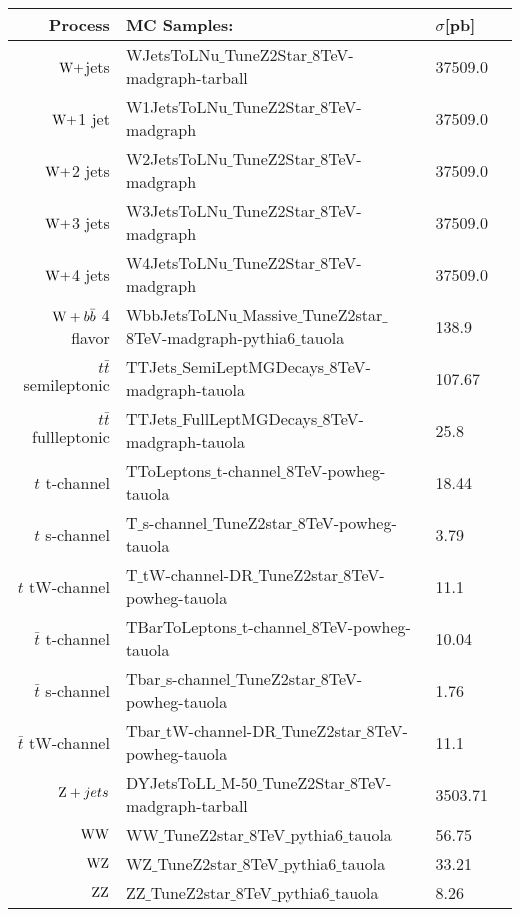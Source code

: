 {\begin{table}[htb]
\begin{center}
\begin{tabular}{|r|l|l|l|}
\bf Process&\bf MC Samples:& \bf{$\sigma$[pb]}\\ 
\hline
$\mathrm{W} + $jets   & WJetsToLNu$\_$TuneZ2Star$\_$8TeV-madgraph-tarball               &37509.0 \\ 
$\mathrm{W} + $1 jet  & W1JetsToLNu$\_$TuneZ2Star$\_$8TeV-madgraph                      &37509.0 \\
$\mathrm{W} + $2 jets & W2JetsToLNu$\_$TuneZ2Star$\_$8TeV-madgraph                      &37509.0 \\
$\mathrm{W} + $3 jets & W3JetsToLNu$\_$TuneZ2Star$\_$8TeV-madgraph                      &37509.0 \\
$\mathrm{W} + $4 jets & W4JetsToLNu$\_$TuneZ2Star$\_$8TeV-madgraph                      &37509.0 \\
$\mathrm{W}+b\bar{b}$ 4 flavor & WbbJetsToLNu$\_$Massive$\_$TuneZ2star$\_$8TeV-madgraph-pythia6$\_$tauola &138.9 \\
\hline
$t\bar{t}$ semileptonic & TTJets$\_$SemiLeptMGDecays$\_$8TeV-madgraph-tauola     &107.67 \\
$t\bar{t}$ fullleptonic & TTJets$\_$FullLeptMGDecays$\_$8TeV-madgraph-tauola     &25.8   \\
$t$ t-channel  & TToLeptons$\_$t-channel$\_$8TeV-powheg-tauola                   &18.44  \\ 
$t$ s-channel  & T$\_$s-channel$\_$TuneZ2star$\_$8TeV-powheg-tauola              &3.79   \\
$t$ tW-channel & T$\_$tW-channel-DR$\_$TuneZ2star$\_$8TeV-powheg-tauola          &11.1   \\
$\bar{t}$ t-channel  & TBarToLeptons$\_$t-channel$\_$8TeV-powheg-tauola          &10.04  \\
$\bar{t}$ s-channel  & Tbar$\_$s-channel$\_$TuneZ2star$\_$8TeV-powheg-tauola     &1.76   \\
$\bar{t}$ tW-channel & Tbar$\_$tW-channel-DR$\_$TuneZ2star$\_$8TeV-powheg-tauola &11.1   \\
\hline
$\mathrm{Z} + jets  $ & DYJetsToLL$\_$M-50$\_$TuneZ2Star$\_$8TeV-madgraph-tarball        &3503.71 \\
$\mathrm{W}\mathrm{W}     $ & WW$\_$TuneZ2star$\_$8TeV$\_$pythia6$\_$tauola                    &56.75   \\
$\mathrm{W}\mathrm{Z}     $ & WZ$\_$TuneZ2star$\_$8TeV$\_$pythia6$\_$tauola                    &33.21   \\
$\mathrm{Z}\mathrm{Z}     $ & ZZ$\_$TuneZ2star$\_$8TeV$\_$pythia6$\_$tauola                    &8.26    \\
\hline
\end{tabular}
\label{tab:MCSAMPLES}
\end{center}
\end{table}


}
